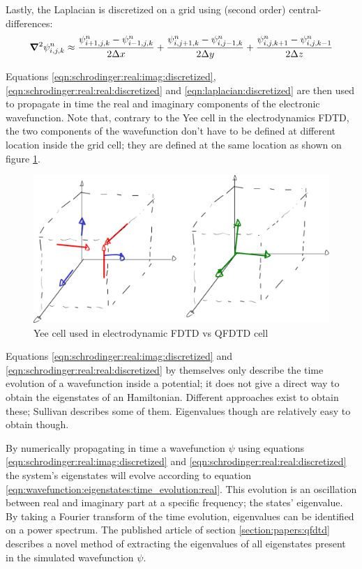 Lastly, the Laplacian is discretized on a grid using (second order)
central-differences:
\begin{align}
\bm{\nabla}^2 \psi_{i,j,k}^{n} \approx
      \frac{ \psi_{i+1,j,k}^{n} - \psi_{i-1,j,k}^{n} }{2 \Delta x}
    + \frac{ \psi_{i,j+1,k}^{n} - \psi_{i,j-1,k}^{n} }{2 \Delta y}
    + \frac{ \psi_{i,j,k+1}^{n} - \psi_{i,j,k-1}^{n} }{2 \Delta z}
\label{eqn:laplacian:discretized}
\end{align}

Equations \eqref{eqn:schrodinger:real:imag:discretized},
\eqref{eqn:schrodinger:real:real:discretized} and
\eqref{eqn:laplacian:discretized} are then used to propagate in time the real
and imaginary components of the electronic wavefunction. Note that, contrary
to the Yee cell in the electrodynamics FDTD, the two components of the
wavefunction don't have to be defined at different location inside the grid
cell; they are defined at the same location as shown on figure
\ref{fig:qfdtd:cell}.

\begin{figure}
 \centering
 \includegraphics[width=0.8\columnwidth]{figures/mockups/yee_vs_qfdtd}
 \caption{Yee cell used in electrodynamic FDTD vs QFDTD cell
          }
 \label{fig:qfdtd:cell}
\end{figure}

Equations \eqref{eqn:schrodinger:real:imag:discretized} and
\eqref{eqn:schrodinger:real:real:discretized} by themselves only describe the
time evolution of a wavefunction inside a potential; it does not give a direct
way to obtain the eigenstates of an Hamiltonian. Different approaches exist to
obtain these; Sullivan describes some of them. Eigenvalues though are
relatively easy to obtain though.

By numerically propagating in time a wavefunction $\psi$ using equations
\eqref{eqn:schrodinger:real:imag:discretized} and
\eqref{eqn:schrodinger:real:real:discretized} the system's eigenstates will
evolve according to equation
\eqref{eqn:wavefunction:eigenstates:time_evolution:real}. This evolution is an
oscillation between real and imaginary part at a specific frequency; the states'
eigenvalue. By taking a Fourier transform of the time evolution, eigenvalues
can be identified on a power spectrum. The published article of section
\ref{section:papers:qfdtd} describes a novel method of extracting the
eigenvalues of all eigenstates present in the simulated wavefunction $\psi$.



